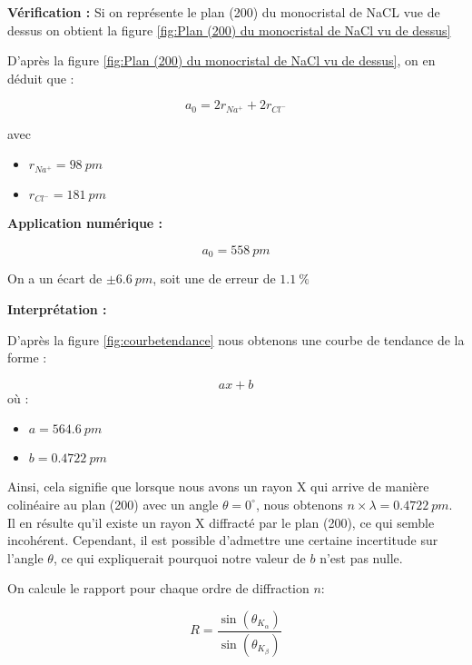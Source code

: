 \begin{flushleft}
	\textbf{Vérification :}
	Si on représente le plan (200) du monocristal de NaCL vue de dessus on obtient la figure \ref{fig:Plan (200) du monocristal de NaCl vu de dessus}
	
	
	D'après la figure \ref{fig:Plan (200) du monocristal de NaCl vu de dessus}, on en déduit que :
	
	\begin{equation}
		a_0 = 2r_{Na^+}+2r_{Cl^-}
	\end{equation}

avec 
\begin{itemize}
	\item $r_{Na^+}= 98 \ pm$
	\item $r_{Cl^-}= 181 \ pm $	
\end{itemize}


\vspace{0.2cm}
\textbf{Application numérique :}
	
	\begin{equation}
		a_0 = 558 \ pm
	\end{equation}
	
On a un écart de $ \pm 6.6\  pm$,  soit une de erreur de $1.1 \ \%$

\textbf{Interprétation :}

D'après la figure \ref{fig:courbetendance} nous obtenons une courbe de tendance de la forme :

\begin{equation}
	a x + b
\end{equation}
où :
\begin{itemize}
	\item $a =564.6 \ pm$ 
	\item $b = 0.4722 \ pm$
\end{itemize}
\vspace{0.2cm}
Ainsi, cela signifie que lorsque nous avons un rayon X qui arrive de manière colinéaire au plan (200) avec un angle $\theta = 0^\circ$, nous obtenons $n \times \lambda = 0.4722 \ pm$. Il en résulte qu'il existe un rayon X diffracté par le plan (200), ce qui semble incohérent. Cependant, il est possible d'admettre une certaine incertitude sur l'angle $\theta$, ce qui expliquerait pourquoi notre valeur de $b$ n'est pas nulle.

\newpage
On calcule le rapport pour chaque ordre de diffraction $n$:

\begin{equation}
	R = \frac{\sin(\theta_{K_{\alpha}})}{\sin(\theta_{K_{\beta}})}
\end{equation}



\end{flushleft}
